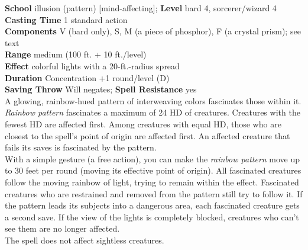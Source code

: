 \textbf{School} illusion (pattern) [mind-affecting]; \textbf{Level} bard 4, sorcerer/wizard 4\\
\textbf{Casting Time} 1 standard action\\
\textbf{Components} V (bard only), S, M (a piece of phosphor), F (a crystal prism); see text\\
\textbf{Range }medium (100 ft. + 10 ft./level)\\
\textbf{Effect} colorful lights with a 20-ft.-radius spread\\
\textbf{Duration} Concentration +1 round/level (D)\\
\textbf{Saving Throw }Will negates; \textbf{Spell Resistance} yes\\
A glowing, rainbow-hued pattern of interweaving colors fascinates those within it. \textit{Rainbow pattern }fascinates a maximum of 24 HD of creatures. Creatures with the fewest HD are affected first. Among creatures with equal HD, those who are closest to the spell's point of origin are affected first. An affected creature that fails its saves is fascinated by the pattern.\\
With a simple gesture (a free action), you can make the \textit{rainbow pattern} move up to 30 feet per round (moving its effective point of origin). All fascinated creatures follow the moving rainbow of light, trying to remain within the effect. Fascinated creatures who are restrained and removed from the pattern still try to follow it. If the pattern leads its subjects into a dangerous area, each fascinated creature gets a second save. If the view of the lights is completely blocked, creatures who can't see them are no longer affected.\\
The spell does not affect sightless creatures.\\
